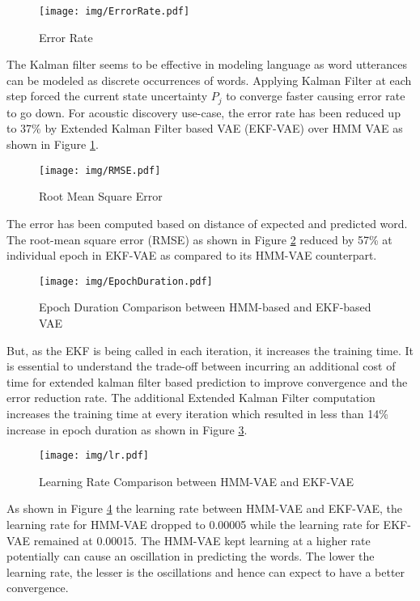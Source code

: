 \documentclass{article}
\begin{document}
\begin{figure}[H] 
    \texttt{[image: img/ErrorRate.pdf]}
    \caption{Error Rate}
    \label{fig:fig6}
\end{figure}

The Kalman filter seems to be effective in modeling language as word utterances can be modeled as discrete occurrences of words. Applying Kalman Filter at each step forced the current state uncertainty $P_{j}$ to converge faster causing error rate to go down. For acoustic discovery use-case, the error rate has been reduced up to 37\% by Extended Kalman Filter based VAE (EKF-VAE) over HMM VAE as shown in Figure \ref{fig:fig6}. 

\begin{figure}[htb]   
    \texttt{[image: img/RMSE.pdf]}
    \caption{Root Mean Square Error}
    \label{fig:fig7} 
\end{figure}

The error has been computed based on distance of expected and predicted word. The root-mean square error (RMSE) as shown in Figure \ref{fig:fig7} reduced by 57\% at individual epoch in EKF-VAE as compared to its HMM-VAE counterpart. 

\begin{figure}[htb] 
    \texttt{[image: img/EpochDuration.pdf]}
    \caption{Epoch Duration Comparison between HMM-based and EKF-based VAE}
    \label{fig:fig8}
\end{figure}

But, as the EKF is being called in each iteration, it increases the training time. It is essential to understand the trade-off between incurring an additional cost of time for extended kalman filter based prediction to improve convergence and the error reduction rate. The additional Extended Kalman Filter computation increases the training time at every iteration which resulted in less than 14\% increase in epoch duration as shown in Figure \ref{fig:fig8}.  

\begin{figure}[H] 
    \texttt{[image: img/lr.pdf]}
    \caption{Learning Rate Comparison between HMM-VAE and EKF-VAE}
    \label{fig:fig9}
\end{figure}

As shown in Figure \ref{fig:fig9} the learning rate between HMM-VAE and EKF-VAE, the learning rate for HMM-VAE dropped to 0.00005 while the learning rate for EKF-VAE remained at 0.00015. The HMM-VAE kept learning at a higher rate potentially can cause an oscillation in predicting the words. The lower the learning rate, the lesser is the oscillations and hence can expect to have a better convergence.
\end{document}
